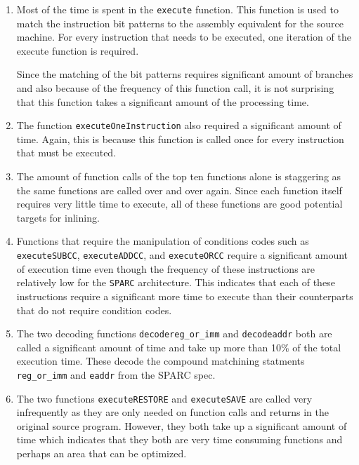 \begin{enumerate}
\item Most of the time is spent in the \verb!execute! function. This
function is used to match the instruction bit patterns to the assembly
equivalent for the source machine. For every instruction that needs to be
executed, one iteration of the execute function is required.

Since the matching of the bit patterns requires significant amount of
branches and also because of the frequency of this function call, it is
not surprising that this function takes a significant amount of the
processing time.

\item The function \verb!executeOneInstruction! also required a
significant amount of time. Again, this is because this function is called
once for every instruction that must be executed.

\item The amount of function calls of the top ten functions alone is
staggering as the same functions are called over and over again. Since
each function itself requires very little time to execute, all of these
functions are good potential targets for inlining.

\item Functions that require the manipulation of conditions codes such as
\verb!executeSUBCC!, \verb!executeADDCC!, and \verb!executeORCC! require a
significant amount of execution time even though the frequency of these
instructions are relatively low for the \verb!SPARC! architecture. This
indicates that each of these instructions require a significant more time
to execute than their counterparts that do not require condition codes.

\item The two decoding functions \verb!decodereg_or_imm! and
\verb!decodeaddr! both are called a significant amount of time and take up
more than 10\% of the total execution time. These decode the compound
matchining statments \verb!reg_or_imm!  and \verb!eaddr! from the SPARC
spec.

\item The two functions \verb!executeRESTORE! and \verb!executeSAVE! are
called very infrequently as they are only needed on function calls and
returns in the original source program. However, they both take up a
significant amount of time which indicates that they both are very time
consuming functions and perhaps an area that can be optimized.

\end{enumerate}


